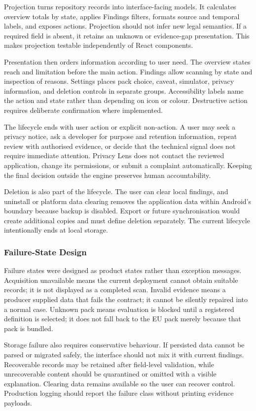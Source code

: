 Projection turns repository records into interface-facing models. It calculates overview totals by state, applies Findings filters, formats source and temporal labels, and exposes actions. Projection should not infer new legal semantics. If a required field is absent, it retains an unknown or evidence-gap presentation. This makes projection testable independently of React components.

Presentation then orders information according to user need. The overview states reach and limitation before the main action. Findings allow scanning by state and inspection of reasons. Settings places pack choice, caveat, simulator, privacy information, and deletion controls in separate groups. Accessibility labels name the action and state rather than depending on icon or colour. Destructive action requires deliberate confirmation where implemented.

The lifecycle ends with user action or explicit non-action. A user may seek a privacy notice, ask a developer for purpose and retention information, repeat review with authorised evidence, or decide that the technical signal does not require immediate attention. Privacy Lens does not contact the reviewed application, change its permissions, or submit a complaint automatically. Keeping the final decision outside the engine preserves human accountability.

Deletion is also part of the lifecycle. The user can clear local findings, and uninstall or platform data clearing removes the application data within Android's boundary because backup is disabled. Export or future synchronisation would create additional copies and must define deletion separately. The current lifecycle intentionally ends at local storage.

\subsubsection{Failure-State Design}

Failure states were designed as product states rather than exception messages. Acquisition unavailable means the current deployment cannot obtain suitable records; it is not displayed as a completed scan. Invalid evidence means a producer supplied data that fails the contract; it cannot be silently repaired into a normal case. Unknown pack means evaluation is blocked until a registered definition is selected; it does not fall back to the EU pack merely because that pack is bundled.

Storage failure also requires conservative behaviour. If persisted data cannot be parsed or migrated safely, the interface should not mix it with current findings. Recoverable records may be retained after field-level validation, while unrecoverable content should be quarantined or omitted with a visible explanation. Clearing data remains available so the user can recover control. Production logging should report the failure class without printing evidence payloads.

